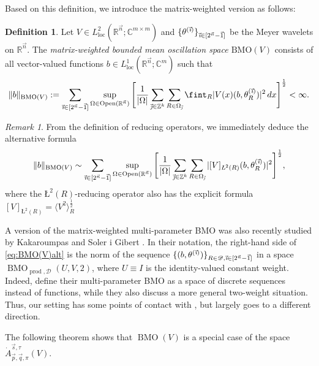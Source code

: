 \documentclass[11pt, reqno]{amsart}
\theoremstyle{definition}
\newtheorem{definition}[theorem]{Definition}
\theoremstyle{remark}
\newtheorem{remark}[theorem]{Remark}
\numberwithin{equation}{section}
\newcommand{\R}{\mathbb R}
\newcommand{\vone}{\vec 1}
\newcommand{\vi}{\vec{\textit{\i}}}
\newcommand{\vj}{\vec{\textit{\j}}}
\newcommand{\vn}{\vec n}
\newcommand{\vp}{\vec p}
\newcommand{\vq}{\vec q}
\newcommand{\vs}{\vec s}
\newcommand{\Atau}{\dot A^{\vs,\tau}_{\vp,\vq,\pi}}
\newcommand{\BMO}{\operatorname{BMO}}
\newcommand{\ave}[1]{\langle #1\rangle}
\newcommand{\aveL}{\textit{\L}}
\newcommand{\Open}{\mathrm{Open}}
\begin{document}
Based on this definition, we introduce the matrix-weighted version as follows:

\begin{definition}\label{def:BMO(V)}
Let $V\in L^2_{\mathrm{loc}}(\mathbb R^{\vec n};\mathbb C^{m\times m})$
and $\{\theta^{(\vi)}\}_{\vi\in[2^{\vec n}-\vec 1]}$ be the Meyer wavelets on $\mathbb R^{\vec n}$.
The \emph{matrix-weighted bounded mean oscillation space $\mathrm{BMO}(V)$}
consists of all vector-valued functions $b\in L^1_{\mathrm{loc}}(\mathbb R^{\vec n};\mathbb C^m)$ such that
$$
\|b\|_{\mathrm{BMO}(V)}
:= \sum_{\vi\in[2^{\vec n}-\vec 1]}
\sup_{\Omega\in\Open(\R^{\vn})} \Bigg[ \frac{1}{|\Omega|}
\sum_{\vj\in\mathbb Z^k} \sum_{R\in \Omega_{\vj}}
\fint_R |V(x)(b,\theta^{(\vi)}_R)|^2 \,dx \Bigg]^{\frac12} <\infty.
$$
\end{definition}

\begin{remark}\label{rem:BMO(V)}
From the definition of reducing operators, we immediately deduce the alternative formula
\begin{equation}\label{eq:BMO(V)alt}
  \|b\|_{\mathrm{BMO}(V)}
\sim \sum_{\vi\in[2^{\vec n}-\vec 1]}
\sup_{\Omega\in\Open(\R^{\vn})} \Bigg[ \frac{1}{|\Omega|}
\sum_{\vj\in\mathbb Z^k} \sum_{R\in \Omega_{\vj}}
 |[V]_{\aveL^2(R)}(b,\theta^{(\vi)}_R)|^2 \Bigg]^{\frac12},
\end{equation}
where the $\aveL^2(R)$-reducing operator also has the explicit formula $[V]_{\aveL^2(R)}=\ave{V^2}_R^{\frac12}$

A version of the matrix-weighted multi-parameter BMO was also recently studied by Kaka\-roumpas and Soler i Gibert \cite{KS2}. In their notation, the right-hand side of \eqref{eq:BMO(V)alt} is the norm of the sequence $\{(b,\theta^{(\vi)})\}_{R\in\mathscr D,\vi\in[2^{\vn}-\vone]}$ in a space $\operatorname{BMO}_{\operatorname{prod},\mathscr D}(U,V,2)$, where $U\equiv I$ is the identity-valued constant weight. Indeed, \cite{KS2} define their multi-parameter BMO as a space of discrete sequences instead of functions, while they also discuss a more general two-weight situation. Thus, our setting has some points of contact with \cite{KS2}, but largely goes to a different direction.
\end{remark}


The following theorem shows that $\BMO(V)$ is a special case of the space $\Atau(V)$.
\end{document}
